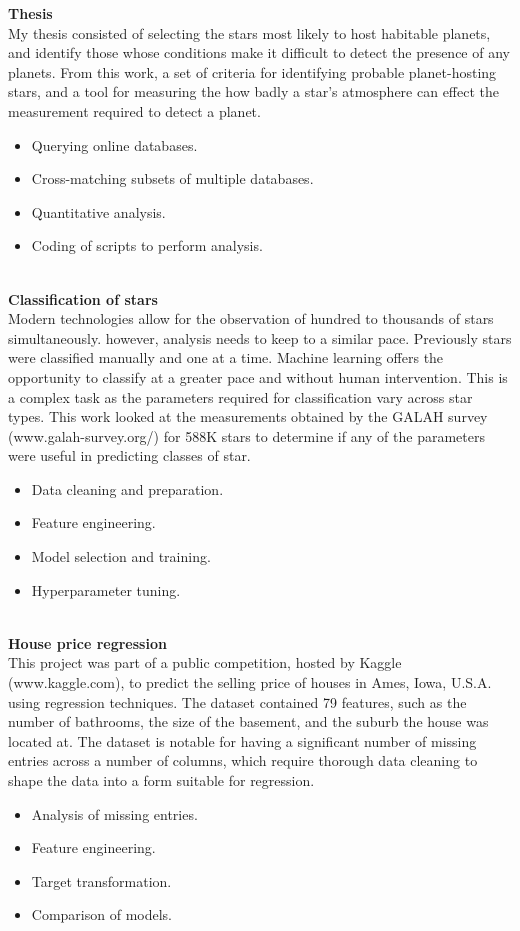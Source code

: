 \textbf{\large{Thesis}}\\
My thesis consisted of selecting the stars most likely to host habitable planets, and identify those whose conditions make it difficult to detect the presence of any planets. From this work, a set of criteria for identifying probable planet-hosting stars, and a tool for measuring the how badly a star's atmosphere can effect the measurement required to detect a planet. 
\begin{itemize}
    \item Querying online databases.
    \item Cross-matching subsets of multiple databases.
    \item Quantitative analysis.
    \item Coding of scripts to perform analysis.
\end{itemize}
\,\\
\textbf{\large{Classification of stars}}\\
Modern technologies allow for the observation of hundred to thousands of stars simultaneously. however, analysis needs to keep to a similar pace. Previously stars were classified manually and one at a time. Machine learning offers the opportunity to classify at a greater pace and without human intervention. This is a complex task as the parameters required for classification vary across star types. This work looked at the measurements obtained by the GALAH survey (www.galah-survey.org/) for 588K stars to determine if any of the parameters were useful in predicting classes of star.
\begin{itemize}
    \item Data cleaning and preparation.
    \item Feature engineering.
    \item Model selection and training.
    \item Hyperparameter tuning.
\end{itemize}
\,\\
\textbf{\large{House price regression}}\\
This project was part of a public competition, hosted by Kaggle (www.kaggle.com), to predict the selling price of houses in Ames, Iowa, U.S.A. using regression techniques. The dataset contained 79 features, such as the number of bathrooms, the size of the basement, and the suburb the house was located at. The dataset is notable for having a significant number of missing entries across a number of columns, which require thorough data cleaning to shape the data into a form suitable for regression.
\begin{itemize}
    \item Analysis of missing entries.
    \item Feature engineering.
    \item Target transformation.
    \item Comparison of models.
\end{itemize}